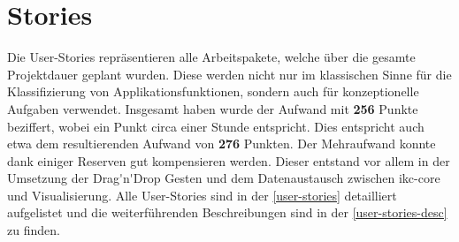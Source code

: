 \section{Stories}
Die User-Stories repräsentieren alle Arbeitspakete, welche über die gesamte Projektdauer geplant wurden. Diese werden nicht nur im klassischen Sinne für die Klassifizierung von Applikationsfunktionen, sondern auch für konzeptionelle Aufgaben verwendet. Insgesamt haben wurde der Aufwand mit \textbf{256} Punkte beziffert, wobei ein Punkt circa einer Stunde entspricht. Dies entspricht auch etwa dem resultierenden Aufwand von \textbf{276} Punkten. Der Mehraufwand konnte dank einiger Reserven gut kompensieren werden. Dieser entstand vor allem in der Umsetzung der \gls{Drag'n'Drop} Gesten und dem Datenaustausch zwischen \gls{ikc-core} und Visualisierung. Alle User-Stories sind in der \autoref{user-stories} detailliert aufgelistet und die weiterführenden Beschreibungen sind in der \autoref{user-stories-desc} zu finden.
